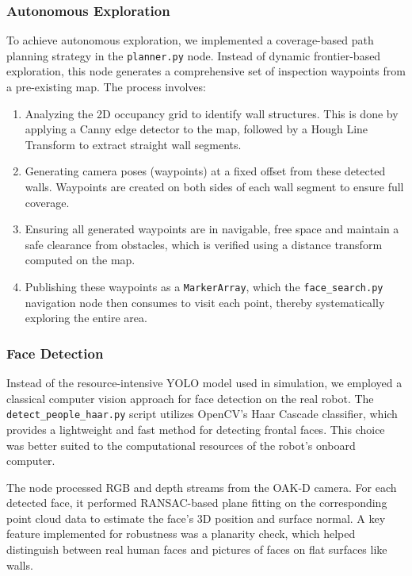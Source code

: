 \documentclass[a4paper]{article}
\begin{document}
\subsubsection{Autonomous Exploration}
To achieve autonomous exploration, we implemented a coverage-based path planning strategy in the \texttt{planner.py} node. Instead of dynamic frontier-based exploration, this node generates a comprehensive set of inspection waypoints from a pre-existing map. The process involves:
\begin{enumerate}
    \item Analyzing the 2D occupancy grid to identify wall structures. This is done by applying a Canny edge detector to the map, followed by a Hough Line Transform to extract straight wall segments.
    \item Generating camera poses (waypoints) at a fixed offset from these detected walls. Waypoints are created on both sides of each wall segment to ensure full coverage.
    \item Ensuring all generated waypoints are in navigable, free space and maintain a safe clearance from obstacles, which is verified using a distance transform computed on the map.
    \item Publishing these waypoints as a \texttt{MarkerArray}, which the \texttt{face\_search.py} navigation node then consumes to visit each point, thereby systematically exploring the entire area.
\end{enumerate}

\subsubsection{Face Detection}
Instead of the resource-intensive YOLO model used in simulation, we employed a classical computer vision approach for face detection on the real robot. The \texttt{detect\_people\_haar.py} script utilizes OpenCV's Haar Cascade classifier, which provides a lightweight and fast method for detecting frontal faces. This choice was better suited to the computational resources of the robot's onboard computer.

The node processed RGB and depth streams from the OAK-D camera. For each detected face, it performed RANSAC-based plane fitting on the corresponding point cloud data to estimate the face's 3D position and surface normal. A key feature implemented for robustness was a planarity check, which helped distinguish between real human faces and pictures of faces on flat surfaces like walls.
\end{document}

